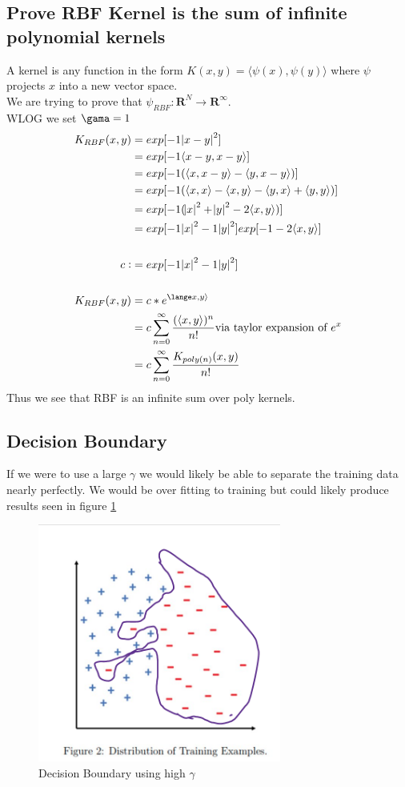 \documentclass[11pt]{article}
\begin{document}
\subsection{Prove RBF Kernel is the sum of infinite polynomial kernels}
A kernel is any function in the form $K(x, y) = \langle \psi(x), \psi(y)\rangle$ where $\psi$ projects $x$ into a new vector space. \\
We are trying to prove that $\psi_{RBF}: \mathbf{R}^N \rightarrow \mathbf{R}^\infty$. \\
WLOG we set $\gama = 1$
\begin{equation}
\begin{split}
K_{RBF}(x, y)  &= exp [-1 \abs{x -y}^2] \\
& = exp [-1 \langle x -y, x-y \rangle] \\
& = exp [-1 (\langle x, x -y \rangle - \langle y, x-y \rangle)] \\
& = exp [-1 (\langle x, x \rangle - \langle x,y \rangle -\langle y, x \rangle + \langle y,y \rangle)] \\
& = exp [-1 (\abs{x}^2 + \abs{y}^2 - 2 \langle x, y \rangle)] \\
& = exp[-1\abs{x}^2-1\abs{y}^2 ]exp[-1 -2 \langle x, y \rangle] \\ \\
c :&= exp[-1\abs{x}^2-1\abs{y}^2 ] \\ \\
K_{RBF}(x, y) &= c*e^{\lange x, y \rangle} \\
&= c \sum_{n=0}^{\infty} \frac{(\langle x, y \rangle)^n}{n!}  \text{via taylor expansion of $e^x$}  \\ 
&= c \sum_{n=0}^{\infty} \frac{K_{poly(n)}(x,y)}{n!}
\end{split}
\end{equation}
Thus we see that RBF is an infinite sum over poly kernels.
\subsection{Decision Boundary}
If we were to use a large $\gamma$ we would likely be able to separate the training data nearly perfectly. We would be over fitting to training but could likely produce results seen in figure \ref{fig:bound}
\begin{figure}[]
\centering
\includegraphics[width=8cm]{Assignments/Assignment1/decisionbound.png}
\caption{Decision Boundary using high $\gamma$}
\label{fig:bound}
\end{figure}
\end{document}
